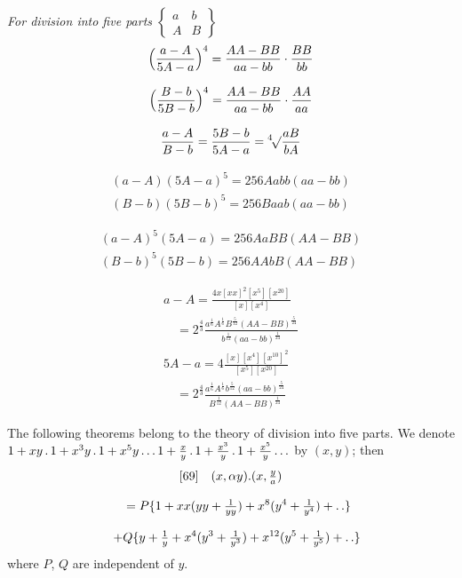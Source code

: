 \begingroup
\renewcommand{\arraystretch}{1.45}

\textit{For division into five parts}\quad
$\left\{\begin{array}{cc}a&b\\A&B\end{array}\right\}$
\[
\begin{gathered}
\Bigl(\frac{a-A}{5A-a}\Bigr)^4=\frac{AA-BB}{aa-bb}\cdot\frac{BB}{bb}\\[8pt]
\Bigl(\frac{B-b}{5B-b}\Bigr)^4=\frac{AA-BB}{aa-bb}\cdot\frac{AA}{aa}\\[8pt]
\frac{a-A}{B-b}=\frac{5B-b}{5A-a}=\mathord{{}^{4}\!\surd}{\frac{aB}{bA}}
\end{gathered}
\]

\[
\begin{gathered}
(a-A)(5A-a)^5=256Aabb(aa-bb)\\[8pt]
(B-b)(5B-b)^5=256Baab(aa-bb)
\end{gathered}
\]

\[
\begin{gathered}
(a-A)^5(5A-a)=256AaBB(AA-BB)\\[8pt]
(B-b)^5(5B-b)=256AAbB(AA-BB)
\end{gathered}
\]

\[
\begin{gathered}
a-A=\frac{4x[xx]^2[x^5][x^{20}]}{[x][x^4]}
 \\[8pt]\quad{}=2^{\frac43}\frac{a^{\frac16}A^{\frac16}B^{\frac5{12}}(AA-BB)^{\frac5{24}}}
 {b^{\frac1{12}}(aa-bb)^{\frac1{24}}}\\[1ex]
5A-a=4\frac{[x][x^4][x^{10}]^2}{[x^5][x^{20}]}
 \\[8pt]\quad{}=2^{\frac43}\frac{a^{\frac16}A^{\frac16}b^{\frac5{12}}(aa-bb)^{\frac5{24}}}
 {B^{\frac1{12}}(AA-BB)^{\frac1{24}}}
\end{gathered}
\]



The following theorems belong to the theory of division into five parts. We denote
$1+xy\,.\,1+x^3y\,.\,1+x^5y\mathinner{.\,.\,.}1+\frac xy\,.\,1+\frac{x^3}y\,.\,1+\frac{x^5}y\mathinner{.\,.\,.}$
by $(x,y)$; then
\[
\begin{gathered}
[69]\quad{}
(x,\alpha y).(x,\tfrac ya)
\\[8pt]\quad{}=P\{1+xx(yy+\tfrac1{yy})+x^8(y^4+\tfrac1{y^4})+\mathinner{.\,.}\}\\[8pt]
\quad+Q\{y+\tfrac1y+x^4(y^3+\tfrac1{y^3})+x^{12}(y^5+\tfrac1{y^5})+\mathinner{.\,.}\}
\end{gathered}
\]
where $P$, $Q$ are independent of $y$.

